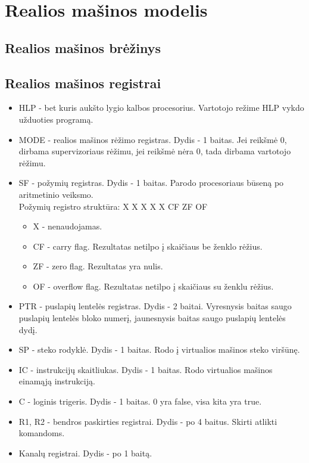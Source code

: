 \section{Realios mašinos modelis}
	\subsection{Realios mašinos brėžinys}
	
	\subsection{Realios mašinos registrai}
	\begin{itemize}
	\item HLP - bet kuris aukšto lygio kalbos procesorius. Vartotojo režime HLP vykdo užduoties programą.
	\item MODE - realios mašinos rėžimo registras. Dydis - 1 baitas. Jei reikšmė 0, dirbama supervizoriaus rėžimu, jei reikšmė nėra 0, tada dirbama vartotojo rėžimu.
	\item SF - požymių registras. Dydis - 1 baitas. Parodo procesoriaus būseną po aritmetinio veiksmo.\\
	Požymių registro struktūra: X X X X X CF ZF OF
	\begin{itemize}
		\item X - nenaudojamas.
		\item CF - carry flag. Rezultatas netilpo į skaičiaus be ženklo rėžius.
		\item ZF - zero flag. Rezultatas yra nulis.
		\item OF - overflow flag. Rezultatas netilpo į skaičiaus su ženklu rėžius.
	\end{itemize}
	\item PTR - puslapių lentelės registras. Dydis - 2 baitai. Vyresnysis baitas saugo puslapių lentelės bloko numerį, jaunesnysis baitas saugo puslapių lentelės dydį.
	\item SP - steko rodyklė. Dydis - 1 baitas. Rodo į virtualios mašinos steko viršūnę.
	\item IC - instrukcijų skaitliukas. Dydis - 1 baitas. Rodo virtualios mašinos einamąją instrukciją.
	\item C - loginis trigeris. Dydis - 1 baitas. 0 yra false, visa kita yra true.
	\item R1, R2 - bendros paskirties registrai. Dydis - po 4 baitus. Skirti atlikti komandoms.
	\item Kanalų registrai. Dydis - po 1 baitą.
	\begin{itemize}

\end{itemize}
\end{itemize}
